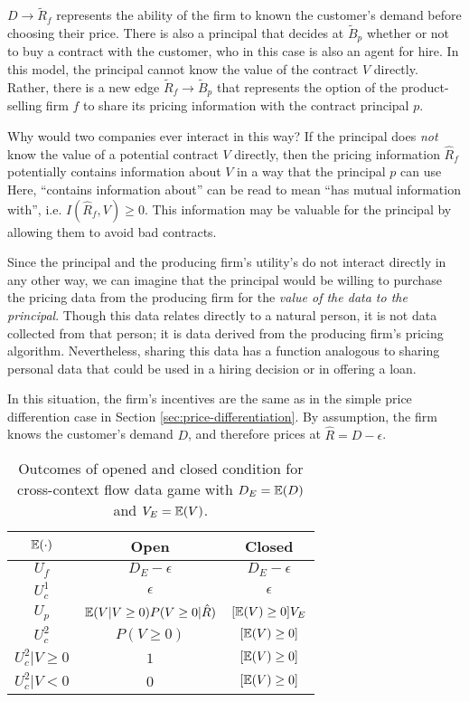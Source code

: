\documentclass[../thesis.tex]{subfiles}
\begin{document}
$D \rightarrow \tilde{R}_f$ represents the ability of
the firm to known the customer's demand before choosing their
price.
There is also a principal that decides at $\tilde{B}_p$
whether or not to buy a contract with the customer, who
in this case is also an agent for hire.
In this model, the principal cannot know the value
of the contract $V$ directly.
Rather, there is a new edge $\tilde{R}_f \rightarrow \tilde{B}_p$
that represents
the option of the product-selling firm $f$ to share its
pricing information with the contract principal $p$.

Why would two companies ever interact in this way?
If the principal does \emph{not} know the value of
a potential contract $V$ directly, then the pricing
information $\hat{R}_f$ potentially contains information
about $V$ in a way that the principal $p$ can use
Here, ``contains information about'' can be read to
mean ``has mutual information with'', i.e.
$I(\hat{R}_f, V) \geq 0$.
This information may be valuable for the principal
by allowing them to avoid bad contracts.

Since the principal and the producing firm's utility's
do not interact directly in any other way, we can
imagine that the principal would be willing to
purchase the pricing data from the producing firm
for the \emph{value of the data to the principal}.
Though this data relates directly to
a natural person, it is not data collected from that
person; it is data derived from the producing firm's
pricing algorithm.
Nevertheless, sharing this data has a function analogous
to sharing personal data that could be used in a hiring decision
or in offering a loan.

In this situation, the firm's incentives are the same
as in the simple price differention
case in Section \ref{sec:price-differentiation}.
By assumption, the firm knows the customer's demand
$D$, and therefore prices at $\hat{R} = D - \epsilon$.

\begin{table}
\begin{center}
\begin{tabular}{ |c|c|c| } 
 \hline
  $\mathbb{E}(\cdot)$ & Open & Closed  \\
 \hline
 $U_f$ & $D_E - \epsilon$ & $D_E - \epsilon$ \\
 $U^1_c$ & $\epsilon$ & $\epsilon$ \\
 $U_p$ & $\mathbb{E}(V \vert V \geq 0) P(V \geq 0 \vert \hat{R})$ & $[\mathbb{E}(V) \geq 0] V_E$  \\
 $U_c^2$ & $P(V \geq 0)$ & $[\mathbb{E}(V) \geq 0]$  \\
 $U_c^2 \vert V \geq 0$ & $1$ & $[\mathbb{E}(V) \geq 0]$  \\
 $U_c^2 \vert V < 0$ & $0$ & $[\mathbb{E}(V) \geq 0]$  \\
 \hline
\end{tabular}
\end{center}
\caption{Outcomes of opened and closed condition for cross-context flow data game with $D_E = \mathbb{E}(D)$ and $V_E = \mathbb{E}(V)$.}
\end{table}
\end{document}
